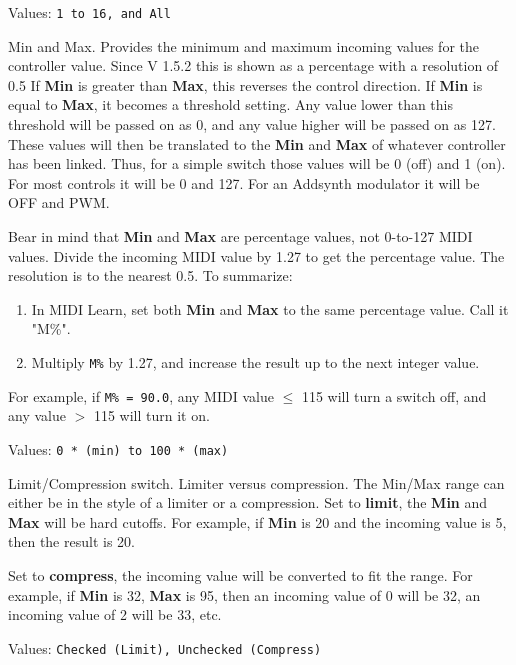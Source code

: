    Values: \texttt{1 to 16, and All}

   Min and Max.
   Provides the minimum and maximum incoming values for the controller value.
   Since V 1.5.2 this is shown as a percentage with a resolution of 0.5
   If \textbf{Min} is greater than \textbf{Max}, this reverses the control
   direction.
   If \textbf{Min} is equal to \textbf{Max}, it becomes a threshold setting.
   Any value lower than this threshold will be passed on as 0, and any
   value higher will be passed on as 127.
   These values will then be translated to the
   \textbf{Min} and \textbf{Max} of whatever
   controller has been linked. Thus, for a simple switch those values
   will be 0 (off) and 1 (on). For most controls it will be 0 and 127.
   For an Addsynth modulator it will be OFF and PWM.

   Bear in mind that \textbf{Min} and \textbf{Max} are percentage values, not
   0-to-127 MIDI values.  Divide the incoming MIDI value by 1.27 to get the
   percentage value.  The resolution is to the nearest 0.5.
   To summarize:

   \begin{enumerate}
      \item In MIDI Learn, set both \textbf{Min} and \textbf{Max} to the same
         percentage value.  Call it "M\%".
      \item Multiply \texttt{M\%} by 1.27, and increase the result up to the
         next integer value.
   \end{enumerate}

   For example, if \texttt{M\% = 90.0}, any MIDI value $\leq$ 115 will turn a
   switch off, and any value $>$ 115 will turn it on.

   Values: \texttt{0 * (min) to 100 * (max)}

   Limit/Compression switch.
   Limiter versus compression.
   The Min/Max range can either be in the style of a limiter or a compression.
   Set to \textbf{limit}, the \textbf{Min} and \textbf{Max} will be hard
   cutoffs.
   For example, if \textbf{Min} is 20 and the incoming value is 5, then the
   result is 20.

   Set to \textbf{compress}, the incoming value will be converted to fit
   the range. For example, if \textbf{Min} is 32, \textbf{Max} is 95, then
   an incoming value of 0 will be 32, an incoming value of 2
   will be 33, etc.

   Values: \texttt{Checked (Limit), Unchecked (Compress)}

